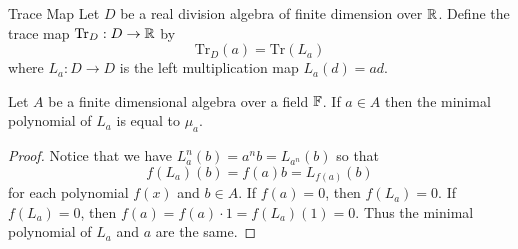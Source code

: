 \documentclass[a4paper]{article}
\begin{document}
\begin{defn}{Trace Map}{} Let $D$ be a real division algebra of finite dimension over $\mathbb{R}$. Define the trace map $\text{Tr}_D:D\to\mathbb{R}$ by $$\text{Tr}_D(a)=\text{Tr}(L_a)$$ where $L_a:D\to D$ is the left multiplication map $L_a(d)=ad$. 
\end{defn}

\begin{lmm}{}{} Let $A$ be a finite dimensional algebra over a field $\mathbb{F}$. If $a\in A$ then the minimal polynomial of $L_a$ is equal to $\mu_a$. \tcbline
\begin{proof}
Notice that we have $L_a^n(b)=a^nb=L_{a^n}(b)$ so that $$f(L_a)(b)=f(a)b=L_{f(a)}(b)$$ for each polynomial $f(x)$ and $b\in A$. If $f(a)=0$, then $f(L_a)=0$. If $f(L_a)=0$, then $f(a)=f(a)\cdot 1=f(L_a)(1)=0$. Thus the minimal polynomial of $L_a$ and $a$ are the same. 
\end{proof}
\end{lmm}
\end{document}
